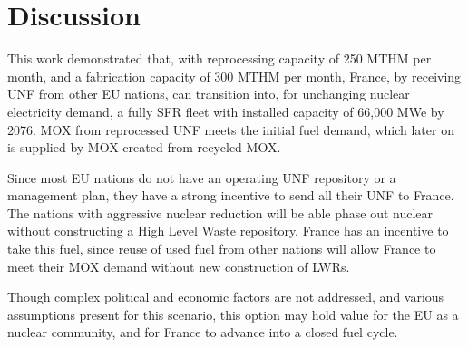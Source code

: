 \section{Discussion}
This work demonstrated that, with reprocessing capacity of 250 MTHM per month,
and a fabrication capacity of 300 MTHM per month,
France, by receiving \gls{UNF} from other \gls{EU} nations,
can transition into, for unchanging nuclear electricity demand,
a fully \gls{SFR} fleet
with installed capacity of 66,000 MWe by 2076.
\gls{MOX} from reprocessed \gls{UNF} meets the initial fuel demand,
which later on is supplied by \gls{MOX} created from recycled \gls{MOX}.

Since most \gls{EU} nations do not have an operating \gls{UNF}
repository or a management plan, they have a strong incentive
to send all their \gls{UNF} to France. The nations
with aggressive nuclear reduction will be able phase out nuclear
without constructing a High Level Waste repository. France has an
incentive to take this fuel, since reuse of used fuel from
other nations will allow France to meet their MOX demand
without new construction of \glspl{LWR}.

Though complex political and economic factors are not
addressed, and various assumptions present for this scenario,
this option may hold value for the \gls{EU} as a nuclear community,
and for France to advance into a closed fuel cycle.
